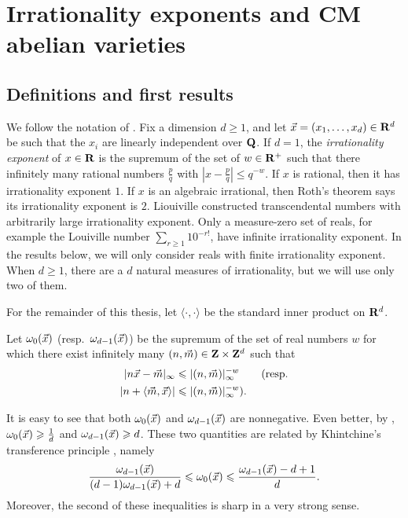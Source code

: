 
\chapter{Irrationality exponents and CM abelian varieties}\label{chapter:irrationality-exponent}





\section{Definitions and first results}

We follow the notation of \cite{laurent-2009}. Fix a dimension 
$d\geqslant 1$, and let $\vec{x}=(x_1,\dots,x_d)\in \mathbf{R}^d$ be such that the $x_i$ 
are linearly independent over $\mathbf{Q}$. If $d = 1$, the \emph{irrationality 
exponent} of $x\in \mathbf{R}$ is the supremum of the set of $w\in \mathbf{R}^+$ such that 
there infinitely many rational numbers $\frac p q$ with 
$\left| x - \frac p q\right| \leqslant q^{-w}$. If $x$ is rational, then it has 
irrationality exponent $1$. If $x$ is an algebraic irrational, then Roth's 
theorem says its irrationality exponent is $2$. Liouiville constructed 
transcendental numbers with arbitrarily large irrationality exponent. Only 
a measure-zero set of reals, for example the Louiville number 
$\sum_{r\geqslant 1} 10^{-r!}$, have infinite irrationality exponent. In the 
results below, we will only consider reals with finite irrationality exponent. 
When $d\geqslant 1$, there are a $d$ natural measures of irrationality, but we 
will use only two of them. 

For the remainder of this thesis, let $\langle \cdot,\cdot\rangle$ be the 
standard inner product on $\mathbf{R}^d$. 

\begin{definition}\label{def:approx-exp}
Let $\omega_0(\vec{x})$ (resp.~$\omega_{d-1}(\vec{x})$) be the supremum of the set of 
real numbers $w$ for which there exist infinitely many 
$(n,\vec{m})\in \mathbf{Z}\times\mathbf{Z}^d$ such that 
\begin{align*}
	|n \vec{x} - \vec{m}|_\infty 
		&\leqslant |(n,\vec{m})|_\infty^{-w}  \qquad\text{(resp.} \\
	|n +\langle \vec{m},\vec{x}\rangle| 
		&\leqslant |(n,\vec{m})|_\infty^{-w} \text{).}
\end{align*}
\end{definition}

It is easy to see that both $\omega_0(\vec{x})$ and $\omega_{d-1}(\vec{x})$ are 
nonnegative. Even better, by \cite[Th.~2 Cor]{laurent-2009}, 
$\omega_0(\vec{x}) \geqslant \frac 1 d$ and $\omega_{d-1}(\vec{x}) \geqslant d$. 
These two quantities are related by Khintchine's transference 
principle \cite[Th.~2]{laurent-2009}, namely 
\[
	\frac{\omega_{d-1}(\vec{x})}{(d-1) \omega_{d-1}(\vec{x})+d} \leqslant \omega_0(\vec{x}) \leqslant \frac{\omega_{d-1}(\vec{x})-d+1}{d} .
\]
Moreover, the second of these inequalities is sharp in a very strong sense. 

